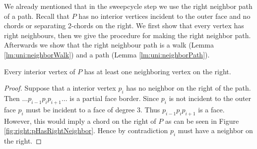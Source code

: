     We already mentioned that in the sweepcycle step we use the right neighbor path of a path. Recall that  $P$ has no interior vertices incident to the outer face and no chords or separating 2-chords on the right. We first show that every vertex has right neighbours, then we give the procedure for making the right neighbor path. Afterwards we show that the right neighbour path is a walk (Lemma \ref{lm:uni:neighborWalk}) and a path (Lemma \ref{lm:uni:neighborPath}).

    \begin{lemma}
      \label{lm:right:pHasRightNeihgbours}
      Every interior vertex of $P$ has at least one neighboring vertex on the right.
    \end{lemma}

    \begin{proof}
      Suppose that a interior vertex $p_i$ has no neighbor on the right of the path. Then $ \ldots p_{i-1} p_i p_{i+1} \ldots $ is a partial face border. Since $p_i$ is not incident to the outer face $p_i$ must be incident to a face of degree $3$. Thus $p_{i-1} p_i p_{i+1}$ is a face. However, this would imply a chord on the right of $P$ as can be seen in Figure \ref{fig:right:pHasRightNeighbor}. Hence by contradiction $p_i$ must have a neighbor on the right.
    \end{proof}

